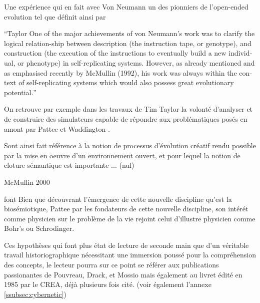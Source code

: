 Une expérience qui en fait avec Von Neumann un des pionniers de l'open-ended evolution tel que définit ainsi par \autocites{Taylor1999,Taylor2012}  

\foreignquote{english}{Taylor One of the major achievements of von Neumann’s work was to clarify the logical relation-ship between description (the instruction tape, or genotype), and construction (the execution of the instructions to eventually build a new individual, or phenotype) in self-replicating systems. However, as already mentioned and as emphasised recently by McMullin (1992), his work was always within the context of self-replicating systems which would also possess great evolutionary potential.}


On retrouve par exemple dans les travaux de Tim Taylor la volonté d'analyser et de construire des simulateurs capable de répondre aux  problématiques posés en amont par Pattee et Waddington \autocite{Taylor1999}. 

Sont ainsi fait référence à la notion de processus d'évolution créatif rendu possible par la mise en oeuvre d'un environnement ouvert, et pour lequel la notion de cloture sémantique est importante ... (nul)

McMullin 2000

 font Bien que découvrant l'émergence de cette nouvelle discipline qu'est la biosémiotique, Pattee par les fondateurs de cette nouvelle discipline, son intérét comme physicien sur le problème de la vie rejoint celui d'illustre physicien comme Bohr's ou Schrodinger. 




Ces hypothèses qui font plus état de lecture de seconde main que d'un véritable travail historiographique nécessitant une immersion poussé pour la compréhension des concepts, le lecteur pourra sur ce point se référer aux publications passionantes de Pouvreau, Drack, et Mossio \autocites{Pouvreau2006, Pouvreau2013, Drack2015} mais également au livret édité en 1985 par le CREA, déjà plusieurs fois cité. (voir également l'annexe \ref{ssubsec:cybernetic})


